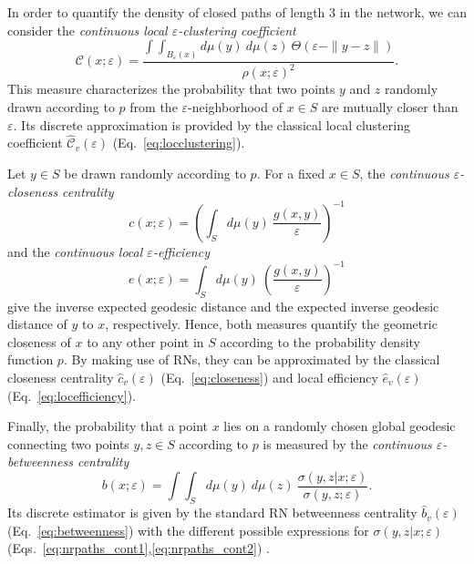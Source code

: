 In order to quantify the density of closed paths of length 3 in the network, we can consider the \emph{continuous local $\varepsilon$-clustering coefficient}
\begin{equation}
\mathcal{C}(x;\varepsilon)=\frac{\int\int_{B_{\varepsilon}(x)} d\mu(y)\ d\mu(z)\ \Theta(\varepsilon-\|y-z\|)}{\rho(x;\varepsilon)^2}.
\end{equation}
\noindent
This measure characterizes the probability that two points $y$ and $z$ randomly drawn according to $p$ from the $\varepsilon$-neighborhood of $x\in S$ are mutually closer than $\varepsilon$. Its discrete approximation is provided by the classical local clustering coefficient $\hat{\mathcal{C}}_v(\varepsilon)$ (Eq.~\ref{eq:locclustering}).

Let $y\in S$ be drawn randomly according to $p$. For a fixed $x\in S$, the \emph{continuous $\varepsilon$-closeness centrality}
\begin{equation}
c(x;\varepsilon)=\left(\int_S d\mu(y)\ \frac{g(x,y)}{\varepsilon}\right)^{-1}
\end{equation}
\noindent
and the \emph{continuous local $\varepsilon$-efficiency} 
\begin{equation}
e(x;\varepsilon)=\int_S d\mu(y)\ \left(\frac{g(x,y)}{\varepsilon}\right)^{-1}
\end{equation}
\noindent
give the inverse expected geodesic distance and the expected inverse geodesic distance of $y$ to $x$, respectively. Hence, both measures quantify the geometric closeness of $x$ to any other point in $S$ according to the probability density function $p$. By making use of RNs, they can be approximated by the classical closeness centrality $\hat{c}_v(\varepsilon)$ (Eq.~\ref{eq:closeness}) and local efficiency $\hat{e}_v(\varepsilon)$ (Eq.~\ref{eq:locefficiency}).

Finally, the probability that a point $x$ lies on a randomly chosen global geodesic connecting two points $y,z\in S$ according to $p$ is measured by the \emph{continuous $\varepsilon$-betweenness centrality}
\begin{equation}
b(x;\varepsilon)=\int\int_S d\mu(y)\ d\mu(z)\ \frac{\sigma(y,z|x;\varepsilon)}{\sigma(y,z;\varepsilon)}.
\end{equation}
\noindent
Its discrete estimator is given by the standard RN betweenness centrality $\hat{b}_v(\varepsilon)$ (Eq.~\ref{eq:betweenness}) with the different possible expressions for $\sigma(y,z|x;\varepsilon)$ (Eqs.~\ref{eq:nrpaths_cont1},\ref{eq:nrpaths_cont2}) \cite{Donges2012PRE}.


